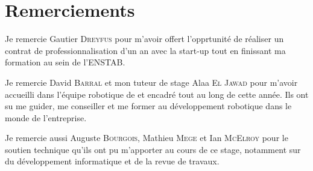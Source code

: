 
\section*{Remerciements}

Je remercie Gautier \textsc{Dreyfus} pour m'avoir offert l'opprtunité de réaliser un contrat de professionnalisation d'un an avec la start-up \forssea{} tout en finissant ma formation au sein de l'\gls{ENSTAB}.

Je remercie David \textsc{Barral} et mon tuteur de stage Alaa \textsc{El Jawad} pour m'avoir accueilli dans l'équipe robotique de \forssea{} et encadré tout au long de cette année. Ils ont su me guider, me conseiller et me former au développement robotique dans le monde de l'entreprise.

Je remercie aussi Auguste \textsc{Bourgois}, Mathieu \textsc{Mege} et Ian \textsc{McElroy} pour le soutien technique qu'ils ont pu m'apporter au cours de ce stage, notamment sur du développement informatique et de la revue de travaux.